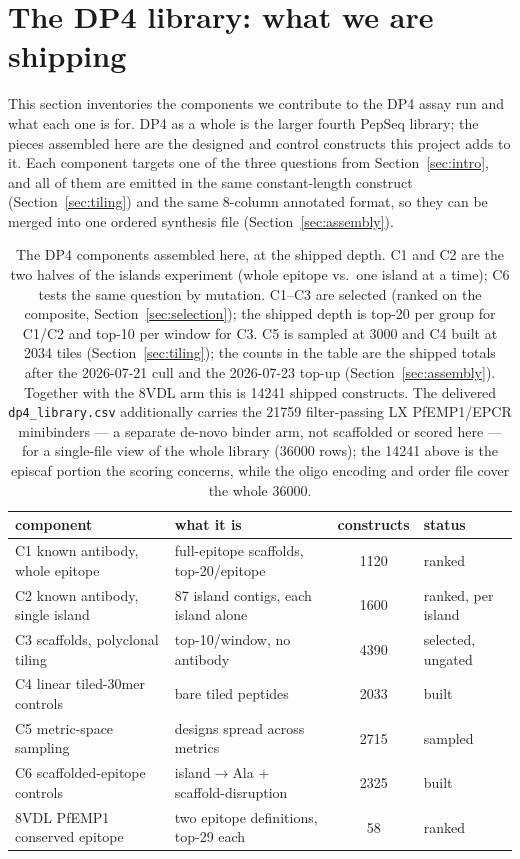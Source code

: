 \section{The DP4 library: what we are shipping}\label{sec:dp4}
This section inventories the components we contribute to the DP4 assay run and what each one is
for. DP4 as a whole is the larger fourth PepSeq library; the pieces assembled here are the
designed and control constructs this project adds to it. Each component targets one of the three
questions from Section~\ref{sec:intro}, and all of them are emitted in the same constant-length
construct (Section~\ref{sec:tiling}) and the same 8-column annotated format, so they can be merged into
one ordered synthesis file (Section~\ref{sec:assembly}).

\begin{table}[h]\centering\small
\begin{tabular}{llcl}
\toprule
component & what it is & constructs & status \\
\midrule
C1 known antibody, whole epitope & full-epitope scaffolds, top-\num{20}/epitope & \num{1120} & ranked \\
C2 known antibody, single island & 87 island contigs, each island alone & \num{1600} & ranked, per island \\
C3 scaffolds, polyclonal tiling & top-\num{10}/window, no antibody & \num{4390} & selected, ungated \\
C4 linear tiled-30mer controls & bare tiled peptides & \num{2033} & built \\
C5 metric-space sampling & designs spread across metrics & \num{2715} & sampled \\
C6 scaffolded-epitope controls & island$\to$Ala $+$ scaffold-disruption & \num{2325} & built \\
8VDL PfEMP1 conserved epitope & two epitope definitions, top-\num{29} each & \num{58} & ranked \\
\bottomrule
\end{tabular}
\caption{The DP4 components assembled here, at the shipped depth. C1 and C2 are the two halves of the
islands experiment (whole epitope vs.\ one island at a time); C6 tests the same question by mutation.
C1--C3 are selected (ranked on the composite, Section~\ref{sec:selection}); the shipped depth is
top-\num{20} per group for C1/C2 and top-\num{10} per window for C3. C5 is sampled at \num{3000} and C4
built at \num{2034} tiles (Section~\ref{sec:tiling}); the counts in the table are the shipped totals after
the 2026-07-21 cull and the 2026-07-23 top-up (Section~\ref{sec:assembly}). Together with the 8VDL arm
this is \num{14241} shipped constructs. The delivered \texttt{dp4\_library.csv} additionally carries the
\num{21759} filter-passing LX PfEMP1/EPCR minibinders --- a separate de-novo binder arm, not scaffolded or
scored here --- for a single-file view of the whole library (\num{36000} rows); the \num{14241} above is
the episcaf portion the scoring concerns, while the oligo encoding and order file cover the whole
\num{36000}.}
\label{tab:dp4components}
\end{table}

